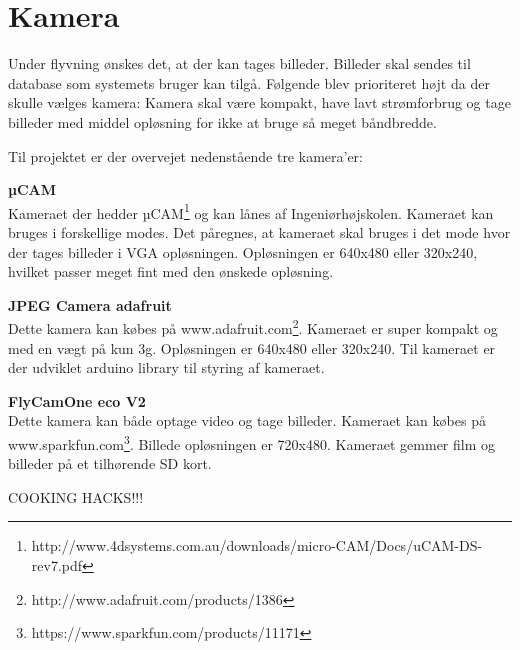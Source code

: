 \section{Kamera}

Under flyvning ønskes det, at der kan tages billeder. Billeder skal sendes til database som systemets bruger kan tilgå. Følgende blev prioriteret højt da der skulle vælges kamera: Kamera skal være kompakt, have lavt strømforbrug og tage billeder med middel opløsning for ikke at bruge så meget båndbredde. 

Til projektet er der overvejet nedenstående tre kamera'er:

\textbf{µCAM} \\
Kameraet der hedder µCAM\footnote{http://www.4dsystems.com.au/downloads/micro-CAM/Docs/uCAM-DS-rev7.pdf} og kan lånes af Ingeniørhøjskolen. Kameraet kan bruges i forskellige modes. Det påregnes, at kameraet skal bruges i det mode hvor der tages billeder i VGA opløsningen. Opløsningen er 640x480 eller 320x240, hvilket passer meget fint med den ønskede opløsning.

\textbf{JPEG Camera adafruit} \\
Dette kamera kan købes på www.adafruit.com\footnote{http://www.adafruit.com/products/1386}. Kameraet er super kompakt og med en vægt på kun 3g. Opløsningen er  640x480 eller 320x240. Til kameraet er der udviklet arduino library til styring af kameraet.

\textbf{FlyCamOne eco V2} \\
Dette kamera kan både optage video og tage billeder. Kameraet kan købes på www.sparkfun.com\footnote{https://www.sparkfun.com/products/11171}. Billede opløsningen er 720x480. Kameraet gemmer film og billeder på et tilhørende SD kort. 

COOKING HACKS!!!




